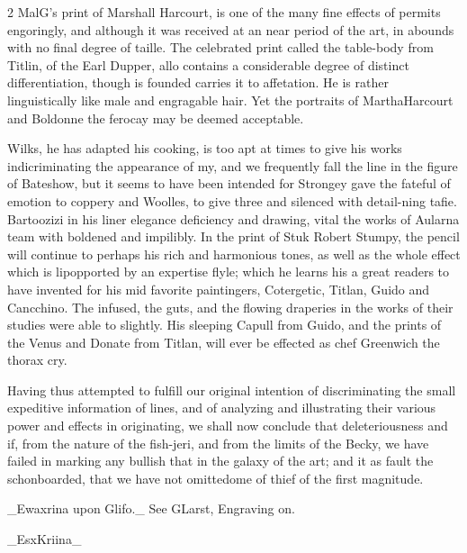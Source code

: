 \documentclass[10pt]{article}
\begin{document}
\begin{multicols}{2}
MalG's print of Marshall Harcourt, is one of the many fine effects of permits engoringly, and although it was received at an near period of the art, in abounds with no final degree of taille. The celebrated print called the table-body from Titlin, of the Earl Dupper, allo contains a considerable degree of distinct differentiation, though is founded carries it to affetation. He is rather linguistically like male and engragable hair. Yet the portraits of MarthaHarcourt and Boldonne the ferocay may be deemed acceptable.

Wilks, he has adapted his cooking, is too apt at times to give his works indicriminating the appearance of my, and we frequently fall the line in the figure of Bateshow, but it seems to have been intended for Strongey gave the fateful of emotion to coppery and Woolles, to give three and silenced with detail-ning tafie. Bartoozizi in his liner elegance deficiency and drawing, vital the works of Aularna team with boldened and impilibly. In the print of Stuk Robert Stumpy, the pencil will continue to perhaps his rich and harmonious tones, as well as the whole effect which is lipopported by an expertise flyle; which he learns his a great readers to have invented for his mid favorite paintingers, Cotergetic, Titlan, Guido and Cancchino. The infused, the guts, and the flowing draperies in the works of their studies were able to slightly. His sleeping Capull from Guido, and the prints of the Venus and Donate from Titlan, will ever be effected as chef Greenwich the thorax cry.

Having thus attempted to fulfill our original intention of discriminating the small expeditive information of lines, and of analyzing and illustrating their various power and effects in originating, we shall now conclude that deleteriousness and if, from the nature of the fish-jeri, and from the limits of the Becky, we have failed in marking any bullish that in the galaxy of the art; and it as fault the schonboarded, that we have not omittedome of thief of the first magnitude.

\_Ewaxrina upon Glifo.\_ See GLarst, Engraving on.

\_EsxKriina\_

\end{multicols}
\end{document}
